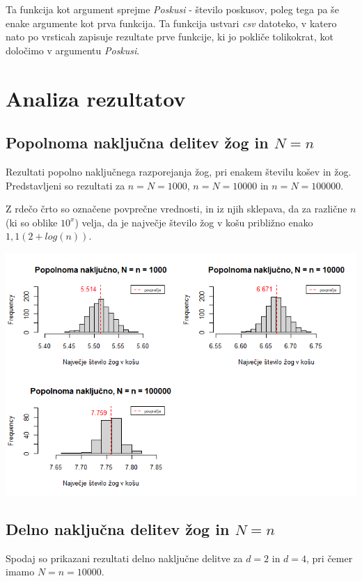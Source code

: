 \documentclass[a4paper, 11pt]{article}
\begin{document}
Ta funkcija kot argument sprejme \emph{Poskusi} - število poskusov, poleg tega pa še enake argumente kot prva funkcija. 
Ta funkcija ustvari \emph{csv} datoteko, v katero nato po vrsticah
zapisuje rezultate prve funkcije, ki jo pokliče tolikokrat,
kot določimo v argumentu \emph{Poskusi}. 

\pagebreak


\section{Analiza rezultatov}

\subsection{Popolnoma naključna delitev žog in $N = n$}
Rezultati popolno naključnega razporejanja žog, pri enakem številu košev in žog.
Predstavljeni so rezultati za $n = N = 1000$, $n = N = 10000$ in $n = N = 100000$.

Z rdečo črto so označene povprečne vrednosti, in iz njih sklepava, da za različne $n$ (ki so 
oblike $10^x$) velja,
da je največje število žog v košu približno enako $1,1(2+log(n))$.

\includegraphics[scale=0.6]{popolnoma_nakljucno.png}

\subsection{Delno naključna delitev žog in $N = n$}

Spodaj so prikazani rezultati delno naključne delitve za $d=2$ in $d=4$, pri čemer imamo
$N = n = 10000$. 
\end{document}
